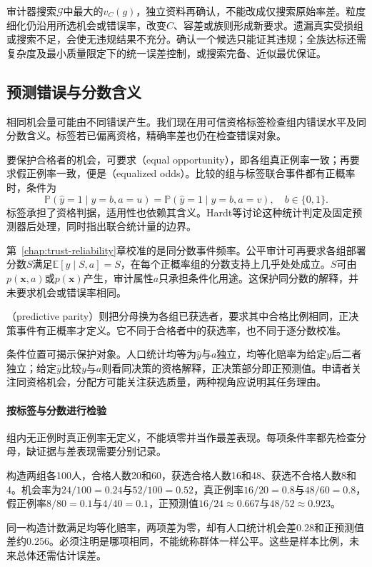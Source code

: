 审计器搜索$\mathcal G$中最大的$v_C(g)$，独立资料再确认，不能改成仅搜索原始率差。粒度细化仍沿用所选机会或错误率，改变$C$、容差或族则形成新要求。遗漏真实受损组或搜索不足，会使无违规结果不充分。确认一个候选只能证其违规；全族达标还需复杂度及最小质量限定下的统一误差控制，或搜索完备、近似最优保证。

\subsection{预测错误与分数含义}
\label{sec:fairness-prediction-comparison}

相同机会量可能由不同错误产生。我们现在用可信资格标签检查组内错误水平及同分数含义。标签若已偏离资格，精确率差也仍在检查错误对象。

要保护合格者的机会，可要求（equal opportunity），即各组真正例率一致；再要求假正例率一致，便是（equalized odds）。比较的组与标签联合事件都有正概率时，条件为
\begin{equation}
 \mathbb P(\hat y=1\mid y=b,a=u)
 =\mathbb P(\hat y=1\mid y=b,a=v),
 \quad b\in\{0,1\}.
 \label{eq:fairness-equalized-odds}
\end{equation}
标签承担了资格判据，适用性也依赖其含义。Hardt等讨论这种统计判定及固定预测器后处理，同时指出联合统计量的边界。

第~\ref{chap:trust-reliability}章校准的是同分数事件频率。公平审计可再要求各组部署分数$S$满足$\mathbb E[y\mid S,a]=S$，在每个正概率组的分数支持上几乎处处成立。$S$可由$p(\bm{x},a)$或$p(\bm{x})$产生，审计属性$a$只承担条件化用途。这保护同分数的解释，并未要求机会或错误率相同。

（predictive parity）则把分母换为各组已获选者，要求其中合格比例相同，正决策事件有正概率才定义。它不同于合格者中的获选率，也不同于逐分数校准。

条件位置可揭示保护对象。人口统计均等为$\hat y$与$a$独立，均等化赔率为给定$y$后二者独立；给定$\hat y$比较$y$与$a$则看同决策的资格解释，正决策部分即正预测值。申请者关注同资格机会，分配方可能关注获选质量，两种视角应说明其任务理由。

\paragraph{按标签与分数进行检验}

组内无正例时真正例率无定义，不能填零并当作最差表现。每项条件率都先检查分母，缺证据与差表现需要分别记录。

\begin{example}[同一批申请者上的不同公平指标]
\label{ex:fairness-rates}
构造两组各100人，合格人数20和60，获选合格人数16和48、获选不合格人数8和4。机会率为$24/100=0.24$与$52/100=0.52$，真正例率$16/20=0.8$与$48/60=0.8$，假正例率$8/80=0.1$与$4/40=0.1$，正预测值$16/24\approx0.667$与$48/52\approx0.923$。

同一构造计数满足均等化赔率，两项差为零，却有人口统计机会差$0.28$和正预测值差约$0.256$。必须注明是哪项相同，不能统称群体一样公平。这些是样本比例，未来总体还需估计误差。
\end{example}

